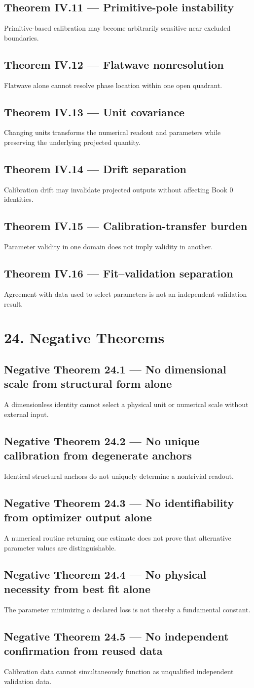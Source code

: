 \documentclass[11pt,oneside,openany]{book}
\newcommand{\PCsection}[1]{%
  \section*{#1}\addcontentsline{toc}{section}{#1}%
}
\newcommand{\PCsubsection}[1]{%
  \subsection*{#1}%
}
\begin{document}
\PCsubsection{Theorem IV.11 --- Primitive-pole instability}

Primitive-based calibration may become arbitrarily sensitive near excluded boundaries.

\PCsubsection{Theorem IV.12 --- Flatwave nonresolution}

Flatwave alone cannot resolve phase location within one open quadrant.

\PCsubsection{Theorem IV.13 --- Unit covariance}

Changing units transforms the numerical readout and parameters while preserving the underlying projected quantity.

\PCsubsection{Theorem IV.14 --- Drift separation}

Calibration drift may invalidate projected outputs without affecting Book 0 identities.

\PCsubsection{Theorem IV.15 --- Calibration-transfer burden}

Parameter validity in one domain does not imply validity in another.

\PCsubsection{Theorem IV.16 --- Fit–validation separation}

Agreement with data used to select parameters is not an independent validation result.


\PCsection{24. Negative Theorems}

\PCsubsection{Negative Theorem 24.1 --- No dimensional scale from structural form alone}

A dimensionless identity cannot select a physical unit or numerical scale without external input.

\PCsubsection{Negative Theorem 24.2 --- No unique calibration from degenerate anchors}

Identical structural anchors do not uniquely determine a nontrivial readout.

\PCsubsection{Negative Theorem 24.3 --- No identifiability from optimizer output alone}

A numerical routine returning one estimate does not prove that alternative parameter values are distinguishable.

\PCsubsection{Negative Theorem 24.4 --- No physical necessity from best fit alone}

The parameter minimizing a declared loss is not thereby a fundamental constant.

\PCsubsection{Negative Theorem 24.5 --- No independent confirmation from reused data}

Calibration data cannot simultaneously function as unqualified independent validation data.
\end{document}
